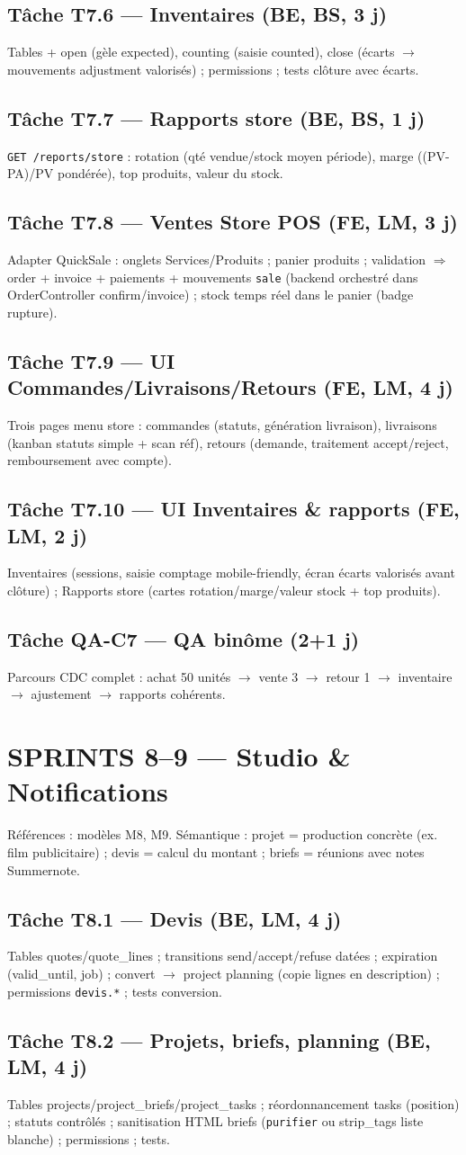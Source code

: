 \documentclass[11pt,a4paper]{article}
\newcommand{\tache}[2]{\subsection{Tâche #1 --- #2}\label{task:#1}}
\begin{document}
\tache{T7.6}{Inventaires (BE, BS, 3 j)} Tables + open (gèle expected), counting (saisie counted), close (écarts $\rightarrow$ mouvements adjustment valorisés) ; permissions ; tests clôture avec écarts.

\tache{T7.7}{Rapports store (BE, BS, 1 j)} \verb|GET /reports/store| : rotation (qté vendue/stock moyen période), marge ((PV-PA)/PV pondérée), top produits, valeur du stock.

\tache{T7.8}{Ventes Store POS (FE, LM, 3 j)} Adapter QuickSale : onglets Services/Produits ; panier produits ; validation $\Rightarrow$ order + invoice + paiements + mouvements \texttt{sale} (backend orchestré dans OrderController confirm/invoice) ; stock temps réel dans le panier (badge rupture).

\tache{T7.9}{UI Commandes/Livraisons/Retours (FE, LM, 4 j)} Trois pages menu store : commandes (statuts, génération livraison), livraisons (kanban statuts simple + scan réf), retours (demande, traitement accept/reject, remboursement avec compte).

\tache{T7.10}{UI Inventaires \& rapports (FE, LM, 2 j)} Inventaires (sessions, saisie comptage mobile-friendly, écran écarts valorisés avant clôture) ; Rapports store (cartes rotation/marge/valeur stock + top produits).

\tache{QA-C7}{QA binôme (2+1 j)} Parcours CDC complet : achat 50 unités $\rightarrow$ vente 3 $\rightarrow$ retour 1 $\rightarrow$ inventaire $\rightarrow$ ajustement $\rightarrow$ rapports cohérents.

\section{SPRINTS 8--9 --- Studio \& Notifications}

Références : modèles M8, M9. Sémantique : projet = production concrète (ex. film publicitaire) ; devis = calcul du montant ; briefs = réunions avec notes Summernote.

\tache{T8.1}{Devis (BE, LM, 4 j)} Tables quotes/quote\_lines ; transitions send/accept/refuse datées ; expiration (valid\_until, job) ; convert $\rightarrow$ project planning (copie lignes en description) ; permissions \verb|devis.*| ; tests conversion.

\tache{T8.2}{Projets, briefs, planning (BE, LM, 4 j)} Tables projects/project\_briefs/project\_tasks ; réordonnancement tasks (position) ; statuts contrôlés ; sanitisation HTML briefs (\verb|purifier| ou strip\_tags liste blanche) ; permissions ; tests.
\end{document}
